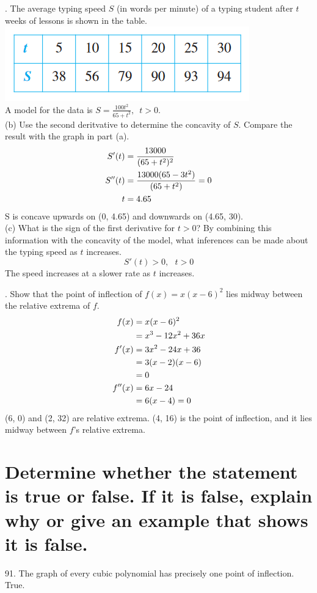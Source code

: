 \documentclass[11pt]{article}
\newcommand*{\vs}{\vspace{1cm}}
\newcommand*{\next}{\noindent}
\newcommand*{\set}{\setcounter{equation}{0}}
\begin{document}
\next
82. The average typing speed $S$ (in words per minute) of a typing student after $t$ weeks of lessons is shown in the table.\\
\includegraphics{82.png}\\
A model for the data is $S=\frac{100t^2}{65+t^2},\,\,\, t>0$.\\
(b) Use the second deritvative to determine the concavity of $S$. Compare the result with the graph in part (a).
\begin{align}
    \set
    S'(t)&=\frac{13000}{(65+t^2)^2}\\
    S''(t)&=\frac{13000(65-3t^2)}{(65+t^2)}=0\\
    t&=4.65
\end{align}
S is concave upwards on (0, 4.65) and downwards on (4.65, 30).\\

\vs
\next
(c) What is the sign of the first derivative for $t>0$? By combining this information with the concavity of the model, what inferences can be made about the typing speed as $t$ increases.\\
\[S'(t)>0,\,\,\,\, t>0\]
The speed increases at a slower rate as $t$ increases.

\vs
\next
88. Show that the point of inflection of $f(x)=x(x-6)^2$ lies midway between the relative extrema of $f$.
\begin{align}
    \set
    f(x)&=x(x-6)^2\\
    &=x^3-12x^2+36x\\
    f'(x)&=3x^2-24x+36\\
    &=3(x-2)(x-6)\\
    &=0\\
    f''(x)&=6x-24\\
    &=6(x-4)=0
\end{align}
(6, 0) and (2, 32) are relative extrema.
(4, 16) is the point of inflection, and it lies midway between $f$'s relative extrema.

\section{Determine whether the statement is true or false. If it is false, explain why or give an example that shows it is false.}
91. The graph of every cubic polynomial has precisely one point of inflection.\\
\indent True.
\end{document}
